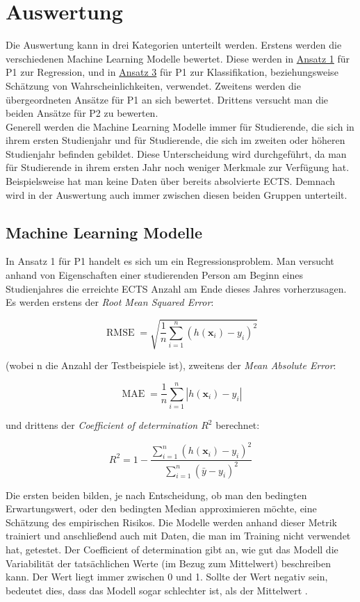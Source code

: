 

\section{Auswertung}
\label{sec:auswertung}
Die Auswertung kann in drei Kategorien unterteilt werden. Erstens werden die verschiedenen Machine Learning Modelle bewertet. 
Diese werden in \hyperref[sec:appr1]{Ansatz 1} f\"ur P1 zur Regression, und in \hyperref[sec:appr2]{Ansatz 3} f\"ur P1 zur Klassifikation, 
beziehungsweise Sch\"atzung von Wahrscheinlichkeiten, verwendet.
Zweitens werden die \"ubergeordneten Ans\"atze f\"ur P1 an sich bewertet. 
Drittens versucht man die beiden Ans\"atze f\"ur P2 zu bewerten. \\

Generell werden die Machine Learning Modelle immer f\"ur Studierende, die sich in ihrem ersten Studienjahr und f\"ur Studierende, die sich im 
zweiten oder h\"oheren Studienjahr befinden gebildet. Diese Unterscheidung wird durchgef\"uhrt, da man f\"ur Studierende in ihrem ersten Jahr noch 
weniger Merkmale zur Verf\"ugung hat. Beispielsweise hat man keine Daten \"uber bereits absolvierte ECTS. Demnach wird in der Auswertung 
auch immer zwischen diesen beiden Gruppen unterteilt.


\subsection{Machine Learning Modelle}
In Ansatz 1 f\"ur P1 handelt es sich um ein Regressionsproblem. Man versucht anhand von Eigenschaften einer studierenden Person am Beginn eines Studienjahres 
die erreichte ECTS Anzahl am Ende dieses Jahres vorherzusagen. Es werden erstens der 
\textit{Root Mean Squared Error}: 

$$ \operatorname{RMSE} = \sqrt{\frac{1}{n}\sum_{i = 1}^{n}(h(\mathbf{x}_i)-y_i)^2} $$

(wobei n die Anzahl der Testbeispiele ist), zweitens der \textit{Mean Absolute Error}:

$$ \operatorname{MAE} = \frac{1}{n}\sum_{i = 1}^{n}|h(\mathbf{x}_i) - y_i| $$

und drittens der \textit{Coefficient of determination $R^2$} berechnet: 

$$ R^2 = 1 - \frac{\sum_{i = 1}^{n}(h(\mathbf{x}_i) - y_i)^2}{\sum_{i=1}^n(\bar{y}-y_i)^2} $$

Die ersten beiden bilden, je nach Entscheidung, ob man den bedingten Erwartungswert, oder den bedingten Median
approximieren m\"ochte, eine Sch\"atzung des empirischen Risikos. Die Modelle werden anhand dieser Metrik trainiert und anschlie{\ss}end 
auch mit Daten, die man im Training nicht verwendet hat, getestet. Der Coefficient of determination gibt an, wie gut das Modell 
die Variabilit\"at der tats\"achlichen Werte (im Bezug zum Mittelwert) beschreiben kann. Der Wert liegt immer zwischen 0 und 1. Sollte der Wert negativ sein, 
bedeutet dies, dass das Modell sogar schlechter ist, als der Mittelwert \cite{guttag}.  \\


